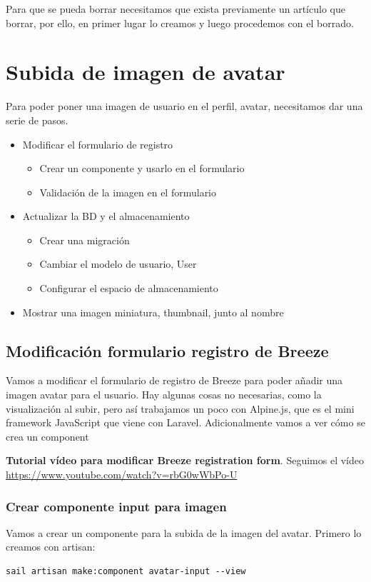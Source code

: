 \documentclass[11pt]{article}
\begin{document}
Para que se pueda borrar necesitamos que exista previamente un
artículo que borrar, por ello, en primer lugar lo creamos y luego
procedemos con el borrado.


\newpage

\section{Subida de imagen de avatar}
\label{sec:orgb1add72}
Para poder poner una imagen de usuario en el perfil, avatar,
necesitamos dar una serie de pasos.
\begin{itemize}
\item Modificar el formulario de registro
\begin{itemize}
\item Crear un componente y usarlo en el formulario
\item Validación de la imagen en el formulario
\end{itemize}
\item Actualizar la BD y el almacenamiento
\begin{itemize}
\item Crear una migración
\item Cambiar el modelo de usuario, User
\item Configurar el espacio de almacenamiento
\end{itemize}
\item Mostrar una imagen miniatura, thumbnail, junto al nombre
\end{itemize}

\subsection{Modificación formulario registro de Breeze}
\label{sec:org5c98f00}
Vamos a modificar el formulario de registro de Breeze para poder
añadir una imagen avatar para el usuario. Hay algunas cosas no
necesarias, como la visualización al subir, pero así trabajamos un
poco con Alpine.js, que es el mini framework JavaScript que viene con
Laravel. Adicionalmente vamos a ver cómo se crea un component

\textbf{Tutorial vídeo para modificar Breeze registration form}.
Seguimos el vídeo \url{https://www.youtube.com/watch?v=rbG0wWbPo-U}

\subsubsection{Crear componente input para imagen}
\label{sec:orgadbbb22}
Vamos a crear un componente para la subida de la imagen del
avatar. Primero lo creamos con artisan:
\begin{verbatim}
sail artisan make:component avatar-input --view
\end{verbatim}
\end{document}
